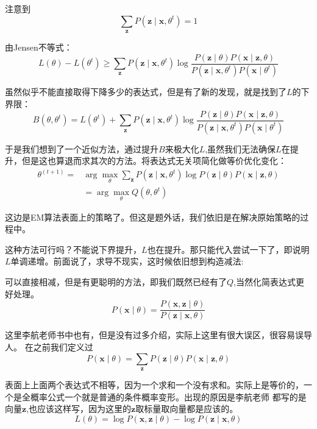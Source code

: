 \documentclass{article}
\begin{document}
        注意到
        \[\sum_{\boldsymbol{z}}P(\boldsymbol{z}\mid\boldsymbol{x},\theta^t)=1\]

        由Jensen不等式：
        \[L(\theta)-L(\theta^t)\ge \sum_{\boldsymbol{z}}P(\boldsymbol{z}\mid\boldsymbol{x},\theta^t)\log\frac{P(\boldsymbol{z}\mid \theta)P(\boldsymbol{x}\mid\boldsymbol{z},\theta)}{P(\boldsymbol{z}\mid\boldsymbol{x},\theta^t)P(\boldsymbol{x}\mid \theta^t)}\]

        虽然似乎不能直接取得下降多少的表达式，但是有了新的发现，就是找到了$L$的下界限：
        \[B(\theta,\theta^t)=L(\theta^t)+\sum_{\boldsymbol{z}}P(\boldsymbol{z}\mid\boldsymbol{x},\theta^t)\log\frac{P(\boldsymbol{z}\mid \theta)P(\boldsymbol{x}\mid\boldsymbol{z},\theta)}{P(\boldsymbol{z}\mid\boldsymbol{x},\theta^t)P(\boldsymbol{x}\mid \theta^t)}\]

        于是我们想到了一个近似方法，通过提升$B$来极大化$L$,虽然我们无法确保$L$在提升，但是这也算退而求其次的方法。将表达式无关项简化做等价优化变化：
        \begin{align*}
            \theta^{(t+1)}=&\arg\max_{\theta}\sum_{\boldsymbol{z}}P(\boldsymbol{z}\mid\boldsymbol{x},\theta^t)\log P(\boldsymbol{z}\mid \theta)P(\boldsymbol{x}\mid\boldsymbol{z},\theta)\\
            &=\arg\max_{\theta}Q(\theta,\theta^t)
        \end{align*}

        这边是EM算法表面上的策略了。但这是题外话，我们依旧是在解决原始策略的过程中。

        这种方法可行吗？不能说下界提升，$L$也在提升。那只能代入尝试一下了，即说明
        $L$单调递增。前面说了，求导不现实，这时候依旧想到构造减法:
        
        可以直接相减，但是有更聪明的方法，即我们既然已经有了$Q$,当然化简表达式更好处理。
        \[P(\boldsymbol{x}\mid \theta)=\frac{P(\boldsymbol{x},\boldsymbol{z}\mid \theta)}{P(\boldsymbol{z}\mid \boldsymbol{x},\theta)}\]

        这里李航老师书中也有，但是没有过多介绍，实际上这里有很大误区，很容易误导人。
        在之前我们定义过
        \[P(\boldsymbol{x}\mid \theta)=\sum_{\boldsymbol{z}}P(\boldsymbol{z}\mid\theta)P(\boldsymbol{x}\mid\boldsymbol{z},\theta)\]

        表面上上面两个表达式不相等，因为一个求和一个没有求和。实际上是等价的，一个是全概率公式一个就是普通的条件概率变形。出现的原因是李航老师
        都写的是向量$\boldsymbol{z}$,也应该这样写，因为这里的$\boldsymbol{z}$取标量取向量都是应该的。
        \[L(\theta)=\log P(\boldsymbol{x},\boldsymbol{z}\mid \theta)-\log P(\boldsymbol{z}\mid \boldsymbol{x},\theta)\]
\end{document}
